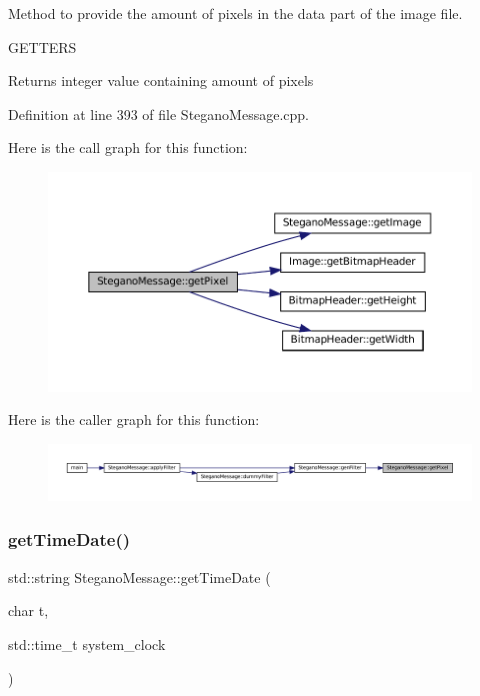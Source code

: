 Method to provide the amount of pixels in the data part of the image file. 

G\+E\+T\+T\+E\+RS\begin{DoxyReturn}{Returns}
integer value containing amount of pixels 
\end{DoxyReturn}


Definition at line 393 of file Stegano\+Message.\+cpp.

Here is the call graph for this function\+:
\nopagebreak
\begin{figure}[H]
\begin{center}
\leavevmode
\includegraphics[width=350pt]{classSteganoMessage_a12231d3596b90fe4c6d67bd694b27d07_cgraph}
\end{center}
\end{figure}
Here is the caller graph for this function\+:
\nopagebreak
\begin{figure}[H]
\begin{center}
\leavevmode
\includegraphics[width=350pt]{classSteganoMessage_a12231d3596b90fe4c6d67bd694b27d07_icgraph}
\end{center}
\end{figure}
\mbox{\label{classSteganoMessage_a9aaa5e476220c95e1a68b4d722de43b1}} 
\subsubsection{\texorpdfstring{getTimeDate()}{getTimeDate()}}
{\footnotesize\ttfamily std\+::string Stegano\+Message\+::get\+Time\+Date (\begin{DoxyParamCaption}\item[{char}]{t,  }\item[{std\+::time\+\_\+t}]{system\+\_\+clock }\end{DoxyParamCaption})\hspace{0.3cm}{\ttfamily [static]}}



